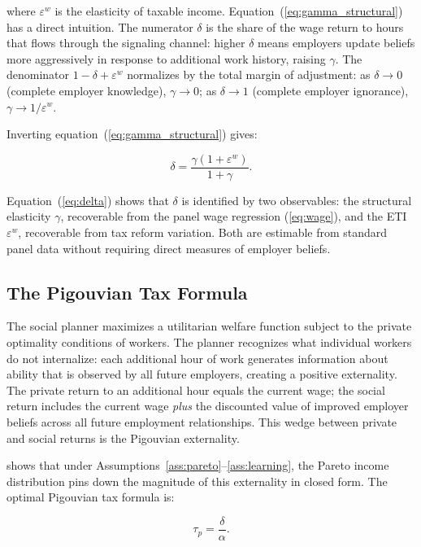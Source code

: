 \documentclass[12pt]{article}
\theoremstyle{definition}
\theoremstyle{remark}
\begin{document}
where $\varepsilon^w$ is the elasticity of taxable income. Equation~(\ref{eq:gamma_structural})
has a direct intuition. The numerator $\delta$ is the share of the wage return to hours that
flows through the signaling channel: higher $\delta$ means employers update beliefs more
aggressively in response to additional work history, raising $\gamma$. The denominator
$1 - \delta + \varepsilon^w$ normalizes by the total margin of adjustment: as $\delta
\to 0$ (complete employer knowledge), $\gamma \to 0$; as $\delta \to 1$ (complete employer
ignorance), $\gamma \to 1/\varepsilon^w$.

Inverting equation~(\ref{eq:gamma_structural}) gives:

\begin{equation}
\label{eq:delta}
\delta = \frac{\gamma(1 + \varepsilon^w)}{1 + \gamma}.
\end{equation}

Equation~(\ref{eq:delta}) shows that $\delta$ is identified by two observables: the
structural elasticity $\gamma$, recoverable from the panel wage regression (\ref{eq:wage}),
and the ETI $\varepsilon^w$, recoverable from tax reform variation. Both are estimable from
standard panel data without requiring direct measures of employer beliefs.

\subsection{The Pigouvian Tax Formula}

The social planner maximizes a utilitarian welfare function subject to the private optimality
conditions of workers. The planner recognizes what individual workers do not internalize: each
additional hour of work generates information about ability that is observed by all future
employers, creating a positive externality. The private return to an additional hour equals
the current wage; the social return includes the current wage \emph{plus} the discounted value
of improved employer beliefs across all future employment relationships. This wedge between
private and social returns is the Pigouvian externality.

\citet{sztutman2024} shows that under Assumptions~\ref{ass:pareto}--\ref{ass:learning},
the Pareto income distribution pins down the magnitude of this externality in closed form.
The optimal Pigouvian tax formula is:

\begin{equation}
\label{eq:taup}
\tau_p = \frac{\delta}{\alpha}.
\end{equation}
\end{document}
